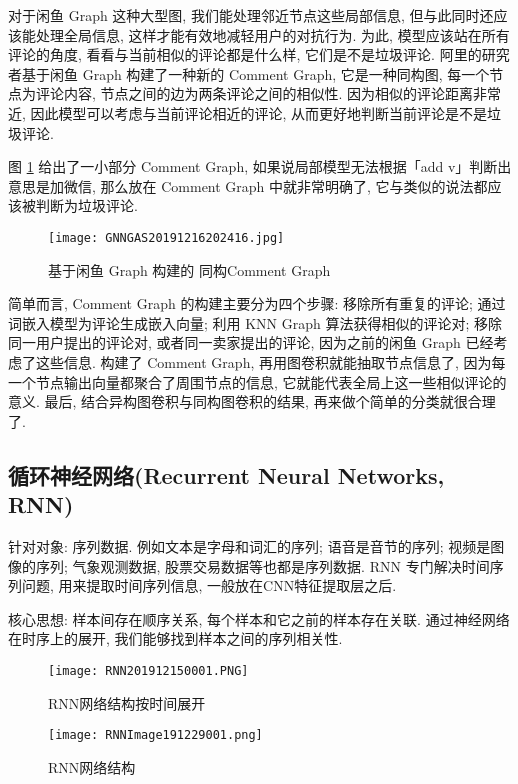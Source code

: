 对于闲鱼 Graph 这种大型图, 我们能处理邻近节点这些局部信息, 但与此同时还应该能处理全局信息, 这样才能有效地减轻用户的对抗行为. 为此, 模型应该站在所有评论的角度, 看看与当前相似的评论都是什么样, 它们是不是垃圾评论.
阿里的研究者基于闲鱼 Graph 构建了一种新的 Comment Graph, 它是一种同构图, 每一个节点为评论内容, 节点之间的边为两条评论之间的相似性. 因为相似的评论距离非常近, 因此模型可以考虑与当前评论相近的评论, 从而更好地判断当前评论是不是垃圾评论.

图 \ref{GNNGAS20191216202416} 给出了一小部分 Comment Graph, 如果说局部模型无法根据「add v」判断出意思是加微信, 那么放在 Comment Graph 中就非常明确了, 它与类似的说法都应该被判断为垃圾评论.
\begin{figure}[H]
\centering
\texttt{[image: GNNGAS20191216202416.jpg]}
\caption{基于闲鱼 Graph 构建的 同构Comment Graph}
\label{GNNGAS20191216202416}
\vspace{-0.4cm}
\end{figure}
简单而言, Comment Graph 的构建主要分为四个步骤: 移除所有重复的评论; 通过词嵌入模型为评论生成嵌入向量; 利用 KNN Graph 算法获得相似的评论对;
移除同一用户提出的评论对, 或者同一卖家提出的评论, 因为之前的闲鱼 Graph 已经考虑了这些信息.
构建了 Comment Graph, 再用图卷积就能抽取节点信息了, 因为每一个节点输出向量都聚合了周围节点的信息, 它就能代表全局上这一些相似评论的意义.
最后, 结合异构图卷积与同构图卷积的结果, 再来做个简单的分类就很合理了.
\subsection{循环神经网络(Recurrent Neural Networks, RNN)}
针对对象: 序列数据. 例如文本是字母和词汇的序列; 语音是音节的序列; 视频是图像的序列; 气象观测数据, 股票交易数据等也都是序列数据. RNN 专门解决时间序列问题, 用来提取时间序列信息, 一般放在CNN特征提取层之后.

核心思想: 样本间存在顺序关系,  每个样本和它之前的样本存在关联.  通过神经网络在时序上的展开,  我们能够找到样本之间的序列相关性.
\begin{figure}[H]
\centering
\texttt{[image: RNN201912150001.PNG]}
\caption{RNN网络结构按时间展开}
\label{RNN201912150001}
\vspace{-0.4cm}
\end{figure}
\begin{figure}[H]
\centering
\texttt{[image: RNNImage191229001.png]}
\caption{RNN网络结构}
\label{RNNImage191229001}
\vspace{-0.4cm}
\end{figure}

